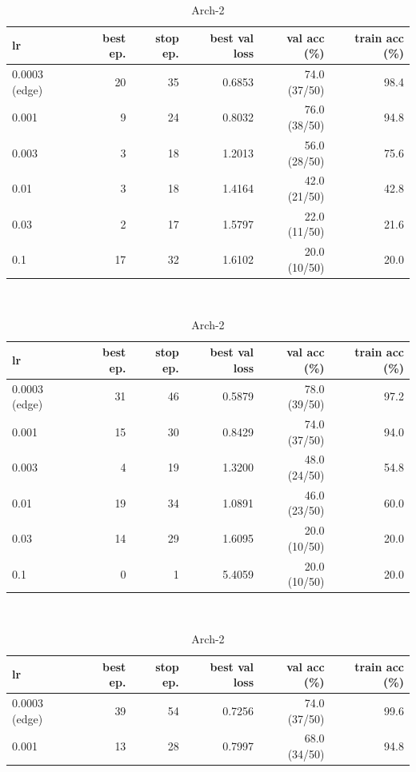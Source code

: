 \documentclass[11pt,a4paper]{article}
\begin{document}
\begin{table}[H]\centering\small
\begin{subtable}{\linewidth}\centering\begin{tabular}{@{}lrrrrr@{}}\toprule
lr & best ep. & stop ep. & best val loss & val acc (\%) & train acc (\%) \\ \midrule
\rowcolor{selrow}0.0003 (edge) & 20 & 35 & 0.6853 & 74.0 (37/50) & 98.4 \\
0.001 & 9 & 24 & 0.8032 & 76.0 (38/50) & 94.8 \\
0.003 & 3 & 18 & 1.2013 & 56.0 (28/50) & 75.6 \\
0.01 & 3 & 18 & 1.4164 & 42.0 (21/50) & 42.8 \\
0.03 & 2 & 17 & 1.5797 & 22.0 (11/50) & 21.6 \\
0.1 & 17 & 32 & 1.6102 & 20.0 (10/50) & 20.0 \\
\bottomrule\end{tabular}\caption{Arch-1}\end{subtable}\\[4pt]
\begin{subtable}{\linewidth}\centering\begin{tabular}{@{}lrrrrr@{}}\toprule
lr & best ep. & stop ep. & best val loss & val acc (\%) & train acc (\%) \\ \midrule
\rowcolor{selrow}0.0003 (edge) & 31 & 46 & 0.5879 & 78.0 (39/50) & 97.2 \\
0.001 & 15 & 30 & 0.8429 & 74.0 (37/50) & 94.0 \\
0.003 & 4 & 19 & 1.3200 & 48.0 (24/50) & 54.8 \\
0.01 & 19 & 34 & 1.0891 & 46.0 (23/50) & 60.0 \\
0.03 & 14 & 29 & 1.6095 & 20.0 (10/50) & 20.0 \\
0.1 & 0 & 1 & 5.4059 & 20.0 (10/50) & 20.0 \\
\bottomrule\end{tabular}\caption{Arch-2}\end{subtable}\\[4pt]
\begin{subtable}{\linewidth}\centering\begin{tabular}{@{}lrrrrr@{}}\toprule
lr & best ep. & stop ep. & best val loss & val acc (\%) & train acc (\%) \\ \midrule
\rowcolor{selrow}0.0003 (edge) & 39 & 54 & 0.7256 & 74.0 (37/50) & 99.6 \\
0.001 & 13 & 28 & 0.7997 & 68.0 (34/50) & 94.8 \\

\end{tabular}
\end{subtable}
\end{table}
\end{document}
